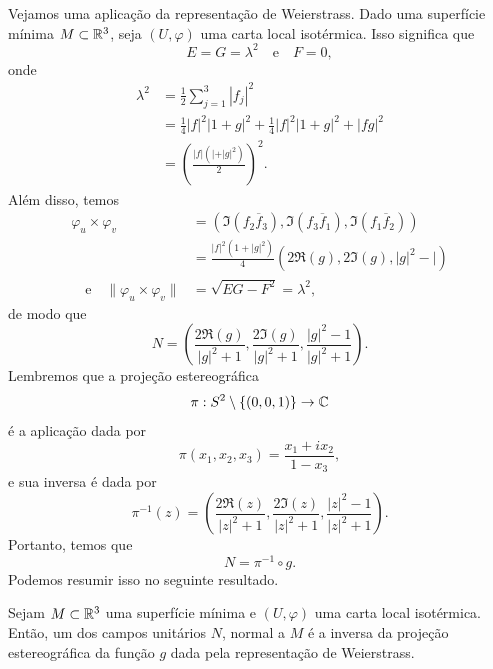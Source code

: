 \begin{exemplo}
	Vejamos uma aplicação da representação de Weierstrass. Dado uma superfície mínima $M \subset \mathbb{R}^3$, seja $(U, \varphi)$ uma carta local isotérmica.
	Isso significa que
	\begin{equation*}
	E = G = \lambda^2 \quad \text{e} \quad
	F = 0,
	\end{equation*}
	onde
	\begin{align*}
	\lambda^2 &= \frac{1}{2} \sum_{j=1}^{3} |f_j|^2 \\
	&= \frac{1}{4} |f|^2 |1 + g|^2 + \frac{1}{4} |f|^2 |1 + g|^2 + |fg|^2\\
	&= \left( \frac{|f| (| + |g|^2)}{2} \right)^2.
	\end{align*} 
	Além disso, temos
	\begin{align*}
	\varphi_u \times \varphi_v &= \left( \Im (f_2 \overline{f}_3), \Im (f_3 \overline{f}_1), \Im (f_1 \overline{f}_2) \right) \\
	&= \frac{|f|^2 (1 + |g|^2)}{4} \left( 2 \Re(g), 2 \Im(g), |g|^2 - | \right)\\
	\quad \text{e} \quad \| \varphi_u \times \varphi_v \| &= \sqrt{EG - F^2} = \lambda^2,
	\end{align*}
	de modo que
	\begin{equation*}
	N = \left( \frac{2 \Re(g)}{|g|^2 + 1}, \frac{2 \Im(g)}{|g|^2 + 1}, \frac{|g|^2 - 1}{|g|^2 + 1} \right).
	\end{equation*}
	Lembremos que a projeção estereográfica
	\begin{equation*}
	\pi: S^2 \setminus \{ (0,0,1) \} \rightarrow \mathbb{C}
	\end{equation*}
	é a aplicação dada por
	\begin{equation*}
	\pi(x_1, x_2, x_3) = \frac{x_1 + ix_2}{1 - x_3},
	\end{equation*}
	e sua inversa é dada por
	\begin{equation*}
	\pi^{-1}(z) = \left( \frac{2 \Re(z)}{|z|^2 + 1}, \frac{2 \Im(z)}{|z|^2 + 1}, \frac{|z|^2 - 1}{|z|^2 + 1} \right).
	\end{equation*}
	Portanto, temos que
	\begin{equation}\label{eq:projecao-esterografica}
	N = \pi^{-1} \circ g.
	\end{equation}
	Podemos resumir isso no seguinte resultado.
\end{exemplo}

\begin{proposicao}
	Sejam $M \subset \mathbb{R}^3$ uma superfície mínima e $(U, \varphi)$ uma carta local isotérmica. Então, um dos campos unitários $N$, normal a $M$ é a inversa da projeção estereográfica da função $g$ dada pela representação de Weierstrass.
\end{proposicao}

